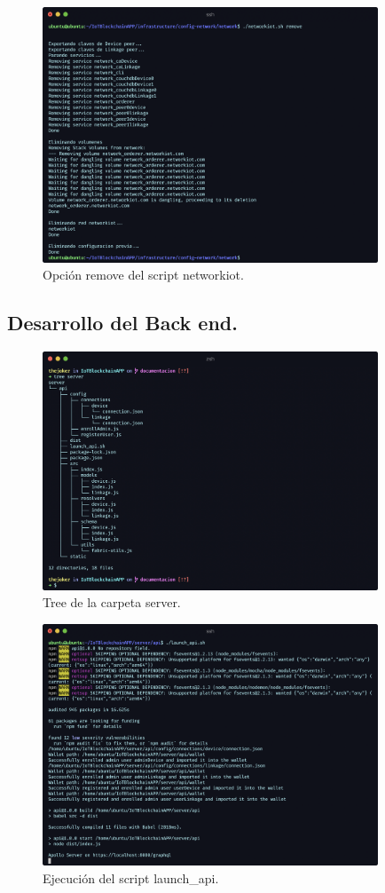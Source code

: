 \begin{figure}[ht!]
  \centering
  \includegraphics[width=10cm]{imagenes/desarrollo/comandos/remove}
  \caption{Opción remove del script networkiot.}
  \label{fig:remove}
\end{figure}

\subsection{Desarrollo del Back end.}

\begin{figure}[ht!]
  \centering
  \includegraphics[width=10cm]{imagenes/desarrollo/tree_server}
  \caption{Tree de la carpeta server.}
  \label{fig:tree-server}
\end{figure}

\begin{figure}[ht!]
  \centering
  \includegraphics[width=10cm]{imagenes/desarrollo/comandos/launch_api}
  \caption{Ejecución del script launch\_api.}
  \label{fig:launch-api}
\end{figure}

